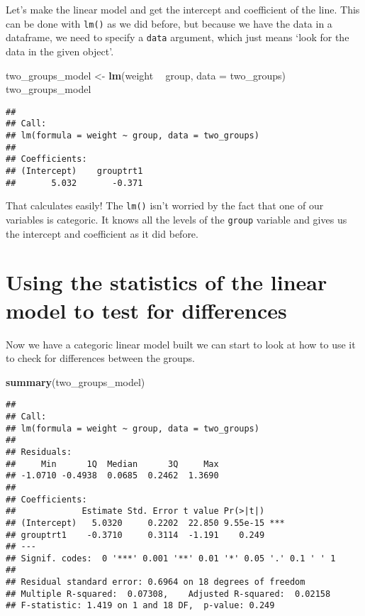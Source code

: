 \documentclass[]{book}
\newenvironment{Shaded}{\begin{snugshade}}{\end{snugshade}}
\newcommand{\DataTypeTok}[1]{\textcolor[rgb]{0.13,0.29,0.53}{#1}}
\newcommand{\KeywordTok}[1]{\textcolor[rgb]{0.13,0.29,0.53}{\textbf{#1}}}
\newcommand{\NormalTok}[1]{#1}
\newcommand{\OperatorTok}[1]{\textcolor[rgb]{0.81,0.36,0.00}{\textbf{#1}}}
\newcommand{\StringTok}[1]{\textcolor[rgb]{0.31,0.60,0.02}{#1}}
\begin{document}
Let's make the linear model and get the intercept and coefficient of the line. This can be done with \texttt{lm()} as we did before, but because we have the data in a dataframe, we need to specify a \texttt{data} argument, which just means `look for the data in the given object'.

\begin{Shaded}
\begin{Highlighting}[]
\NormalTok{two_groups_model <-}\StringTok{ }\KeywordTok{lm}\NormalTok{(weight }\OperatorTok{~}\StringTok{ }\NormalTok{group, }\DataTypeTok{data =}\NormalTok{ two_groups)}
\NormalTok{two_groups_model}
\end{Highlighting}
\end{Shaded}

\begin{verbatim}
## 
## Call:
## lm(formula = weight ~ group, data = two_groups)
## 
## Coefficients:
## (Intercept)    grouptrt1  
##       5.032       -0.371
\end{verbatim}

That calculates easily! The \texttt{lm()} isn't worried by the fact that one of our variables is categoric. It knows all the levels of the \texttt{group} variable and gives us the intercept and coefficient as it did before.

\hypertarget{using-the-statistics-of-the-linear-model-to-test-for-differences}{%
\section{Using the statistics of the linear model to test for differences}\label{using-the-statistics-of-the-linear-model-to-test-for-differences}}

Now we have a categoric linear model built we can start to look at how to use it to check for differences between the groups.

\begin{Shaded}
\begin{Highlighting}[]
\KeywordTok{summary}\NormalTok{(two_groups_model)}
\end{Highlighting}
\end{Shaded}

\begin{verbatim}
## 
## Call:
## lm(formula = weight ~ group, data = two_groups)
## 
## Residuals:
##     Min      1Q  Median      3Q     Max 
## -1.0710 -0.4938  0.0685  0.2462  1.3690 
## 
## Coefficients:
##             Estimate Std. Error t value Pr(>|t|)    
## (Intercept)   5.0320     0.2202  22.850 9.55e-15 ***
## grouptrt1    -0.3710     0.3114  -1.191    0.249    
## ---
## Signif. codes:  0 '***' 0.001 '**' 0.01 '*' 0.05 '.' 0.1 ' ' 1
## 
## Residual standard error: 0.6964 on 18 degrees of freedom
## Multiple R-squared:  0.07308,    Adjusted R-squared:  0.02158 
## F-statistic: 1.419 on 1 and 18 DF,  p-value: 0.249
\end{verbatim}
\end{document}
